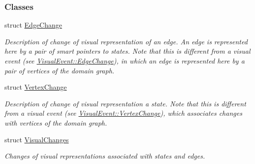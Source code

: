 \subsubsection*{Classes}
\begin{DoxyCompactItemize}
\item 
struct \hyperlink{structEventBase_1_1EdgeChange}{Edge\+Change}
\begin{DoxyCompactList}\small\item\em Description of change of visual representation of an edge. An edge is represented here by a pair of smart pointers to states. Note that this is different from a visual event (see \hyperlink{structVisualEvent_1_1EdgeChange}{Visual\+Event\+::\+Edge\+Change}), in which an edge is represented here by a pair of vertices of the domain graph. \end{DoxyCompactList}\item 
struct \hyperlink{structEventBase_1_1VertexChange}{Vertex\+Change}
\begin{DoxyCompactList}\small\item\em Description of change of visual representation a state. Note that this is different from a visual event (see \hyperlink{structVisualEvent_1_1VertexChange}{Visual\+Event\+::\+Vertex\+Change}), which associates changes with vertices of the domain graph. \end{DoxyCompactList}\item 
struct \hyperlink{structEventBase_1_1VisualChanges}{Visual\+Changes}
\begin{DoxyCompactList}\small\item\em Changes of visual representations associated with states and edges. \end{DoxyCompactList}\end{DoxyCompactItemize}
